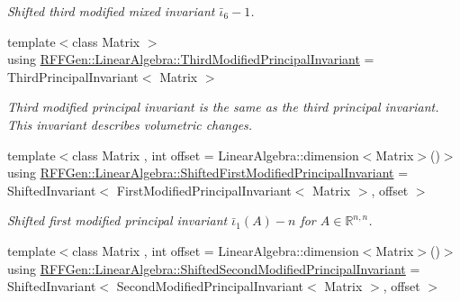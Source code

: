 \begin{DoxyCompactItemize}
\begin{DoxyCompactList}\small\item\em Shifted third modified mixed invariant $ \bar\iota_6 - 1 $. \end{DoxyCompactList}\item 
\hypertarget{group__InvariantGroup_gaa792be731084cbbbc5156be9ea1b34ef}{{\footnotesize template$<$class Matrix $>$ }\\using \hyperlink{group__InvariantGroup_gaa792be731084cbbbc5156be9ea1b34ef}{R\-F\-F\-Gen\-::\-Linear\-Algebra\-::\-Third\-Modified\-Principal\-Invariant} = Third\-Principal\-Invariant$<$ Matrix $>$}\label{group__InvariantGroup_gaa792be731084cbbbc5156be9ea1b34ef}

\begin{DoxyCompactList}\small\item\em Third modified principal invariant is the same as the third principal invariant. This invariant describes volumetric changes. \end{DoxyCompactList}\item 
\hypertarget{group__InvariantGroup_gae337e31060263dfcdbcdd5301659a79c}{{\footnotesize template$<$class Matrix , int offset = Linear\-Algebra\-::dimension$<$\-Matrix$>$()$>$ }\\using \hyperlink{group__InvariantGroup_gae337e31060263dfcdbcdd5301659a79c}{R\-F\-F\-Gen\-::\-Linear\-Algebra\-::\-Shifted\-First\-Modified\-Principal\-Invariant} = Shifted\-Invariant$<$ First\-Modified\-Principal\-Invariant$<$ Matrix $>$, offset $>$}\label{group__InvariantGroup_gae337e31060263dfcdbcdd5301659a79c}

\begin{DoxyCompactList}\small\item\em Shifted first modified principal invariant $ \bar\iota_1(A) - n $ for $ A\in\mathbb{R}^{n,n} $. \end{DoxyCompactList}\item 
\hypertarget{group__InvariantGroup_ga8d736a3e8713fe3445b04dd4ead07788}{{\footnotesize template$<$class Matrix , int offset = Linear\-Algebra\-::dimension$<$\-Matrix$>$()$>$ }\\using \hyperlink{group__InvariantGroup_ga8d736a3e8713fe3445b04dd4ead07788}{R\-F\-F\-Gen\-::\-Linear\-Algebra\-::\-Shifted\-Second\-Modified\-Principal\-Invariant} = Shifted\-Invariant$<$ Second\-Modified\-Principal\-Invariant$<$ Matrix $>$, offset $>$}\label{group__InvariantGroup_ga8d736a3e8713fe3445b04dd4ead07788}


\end{DoxyCompactItemize}
